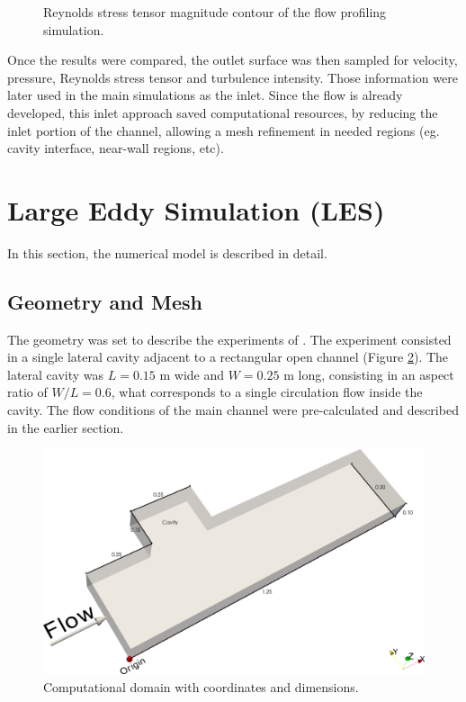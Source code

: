 \begin{refsection}
\begin{figure}[!ht]
  \caption{Reynolds stress tensor magnitude contour of the flow profiling simulation.}
  \label{fig:flowProfReyStress}
\end{figure}

Once the results were compared, the outlet surface was then sampled for velocity, pressure, Reynolds stress tensor and turbulence intensity. Those information were later used in the main simulations as the inlet. Since the flow is already developed, this inlet approach saved computational resources, by reducing the inlet portion of the channel, allowing a mesh refinement in needed regions (eg. cavity interface, near-wall regions, etc).

\section{Large Eddy Simulation (LES)}
In this section, the numerical model is described in detail.

\subsection{Geometry and Mesh}
The geometry was set to describe the experiments of \textcite{xiang2019}. The experiment consisted in a single lateral cavity adjacent to a rectangular open channel (Figure \ref{fig:geometry}). The lateral cavity was $L = 0.15$ m wide and $W = 0.25$ m long, consisting in an aspect ratio of $W/L = 0.6$, what corresponds to a single circulation flow inside the cavity. The flow conditions of the main channel were pre-calculated and described in the earlier section.

\begin{figure}[!ht]
  \centering
  \includegraphics[width=\linewidth]{../images/methods/geometry.png}
  \caption{Computational domain with coordinates and dimensions.}
  \label{fig:geometry}
\end{figure}


\end{refsection}

